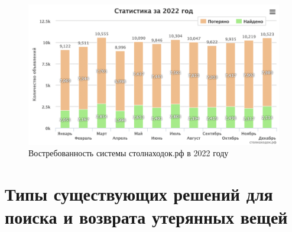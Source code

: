 \documentclass{../mirea}
\begin{document}
	\begin{figure}[htb]
		\centering
		\includegraphics[width=.6\textwidth]{../images/chart2022}
		\parskip=6pt
		\caption{Востребованность системы столнаходок.рф в 2022 году}
		\label{fig:chart2022}
	\end{figure}
	
	\section{Типы существующих решений для поиска и возврата утерянных вещей}
	
\end{document}
